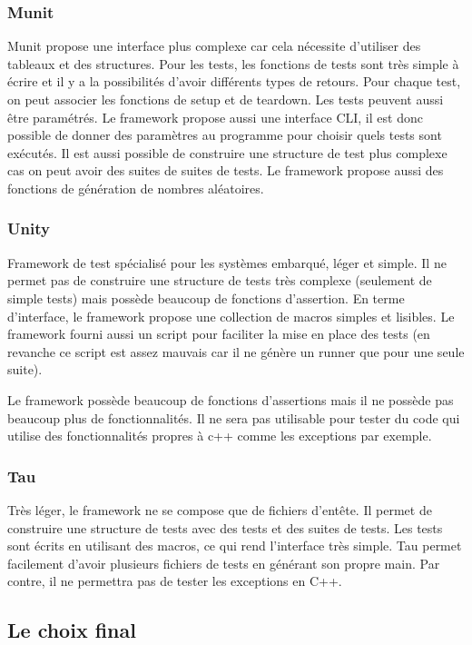 \documentclass[a4paper]{article}
\begin{document}
\subsubsection*{Munit}

Munit propose une interface plus complexe car cela nécessite d'utiliser des
tableaux et des structures. Pour les tests, les fonctions de tests sont très
simple à écrire et il y a la possibilités d'avoir différents types de retours.
Pour chaque test, on peut associer les fonctions de setup et de teardown. Les
tests peuvent aussi être paramétrés. Le framework propose aussi une interface
CLI, il est donc possible de donner des paramètres au programme pour choisir
quels tests sont exécutés. Il est aussi possible de construire une structure de
test plus complexe cas on peut avoir des suites de suites de tests. Le framework
propose aussi des fonctions de génération de nombres aléatoires.

\subsubsection*{Unity}

Framework de test spécialisé pour les systèmes embarqué, léger et simple. Il ne
permet pas de construire une structure de tests très complexe (seulement de
simple tests) mais possède beaucoup de fonctions d'assertion. En terme
d'interface, le framework propose une collection de macros simples et lisibles.
Le framework fourni aussi un script pour faciliter la mise en place des tests
(en revanche ce script est assez mauvais car il ne génère un runner que pour une
seule suite).

Le framework possède beaucoup de fonctions d'assertions mais il ne possède pas
beaucoup plus de fonctionnalités. Il ne sera pas utilisable pour tester du code
qui utilise des fonctionnalités propres à c++ comme les exceptions par exemple.

\subsubsection*{Tau}

Très léger, le framework ne se compose que de fichiers d'entête. Il permet de
construire une structure de tests avec des tests et des suites de tests. Les
tests sont écrits en utilisant des macros, ce qui rend l'interface très simple.
Tau permet facilement d'avoir plusieurs fichiers de tests en générant son propre
main. Par contre, il ne permettra pas de tester les exceptions en C++.
\subsection{Le choix final}%
\end{document}
